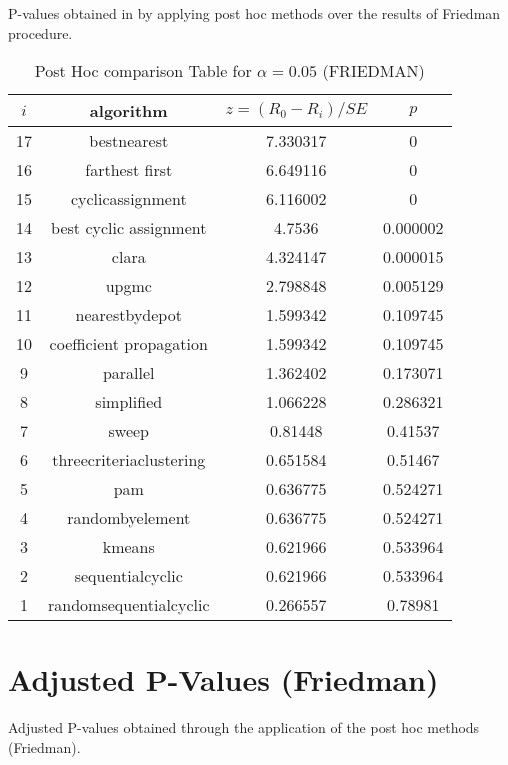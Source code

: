 \documentclass[a4paper,10pt]{article}
\begin{document}
\begin{landscape}
P-values obtained in by applying post hoc methods over the results of Friedman procedure.

\begin{table}[!htp]
\centering\footnotesize
\begin{tabular}{cccc}
$i$&algorithm&$z=(R_0 - R_i)/SE$&$p$\\
\hline17&bestnearest&7.330317&0\\16&farthest first&6.649116&0\\15&cyclicassignment&6.116002&0\\14&best cyclic assignment&4.7536&0.000002\\13&clara&4.324147&0.000015\\12&upgmc&2.798848&0.005129\\11&nearestbydepot&1.599342&0.109745\\10&coefficient propagation&1.599342&0.109745\\9&parallel&1.362402&0.173071\\8&simplified&1.066228&0.286321\\7&sweep&0.81448&0.41537\\6&threecriteriaclustering&0.651584&0.51467\\5&pam&0.636775&0.524271\\4&randombyelement&0.636775&0.524271\\3&kmeans&0.621966&0.533964\\2&sequentialcyclic&0.621966&0.533964\\1&randomsequentialcyclic&0.266557&0.78981\\\hline
\end{tabular}
\caption{Post Hoc comparison Table for $\alpha=0.05$ (FRIEDMAN)}
\end{table}
\newpage

\section{Adjusted P-Values (Friedman)}


Adjusted P-values obtained through the application of the post hoc methods (Friedman).


\end{landscape}
\end{document}
